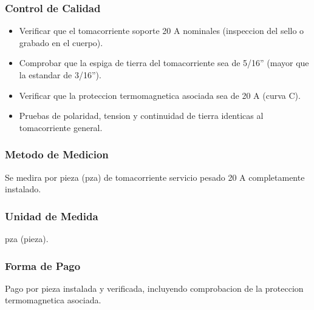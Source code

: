 \subsubsection{Control de Calidad}

\begin{itemize}
  \item Verificar que el tomacorriente soporte 20 A nominales (inspeccion del sello o grabado en el cuerpo).
  \item Comprobar que la espiga de tierra del tomacorriente sea de 5/16'' (mayor que la estandar de 3/16'').
  \item Verificar que la proteccion termomagnetica asociada sea de 20 A (curva C).
  \item Pruebas de polaridad, tension y continuidad de tierra identicas al tomacorriente general.
\end{itemize}

\subsubsection{Metodo de Medicion}

Se medira por pieza (pza) de tomacorriente servicio pesado 20 A completamente instalado.

\subsubsection{Unidad de Medida}

pza (pieza).

\subsubsection{Forma de Pago}

Pago por pieza instalada y verificada, incluyendo comprobacion de la proteccion termomagnetica asociada.
